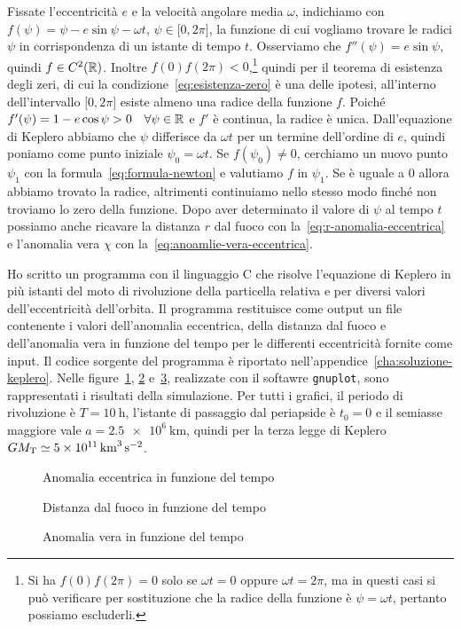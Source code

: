 Fissate l'eccentricità $e$ e la velocità angolare media $\omega$, indichiamo con
$f(\psi) = \psi -e\sin\psi-\omega t$, $\psi\in\mathopen{[}0, 2\pi\mathclose{]}$,
la funzione di cui vogliamo trovare le radici $\psi$ in corrispondenza di un
istante di tempo $t$. Osserviamo che $f''(\psi) = e\sin\psi$, quindi
$f\in C^2(\mathbb{R})$. Inoltre $f(0)f(2\pi) <
0$,\footnote{Si
  ha $f(0)f(2\pi) = 0$ solo se $\omega t = 0$ oppure $\omega t = 2\pi$, ma in
  questi casi si può verificare per sostituzione che la radice della funzione è
  $\psi = \omega t$, pertanto possiamo escluderli.}
quindi per il teorema di esistenza degli zeri, di cui la
condizione~\eqref{eq:esistenza-zero} è una delle ipotesi, all'interno
dell'intervallo $\mathopen{[}0, 2\pi\mathclose{]}$ esiste almeno una radice
della funzione $f$. Poiché
$f'(\psi) = 1 - e\cos\psi > 0 \quad \forall \psi\in\mathbb{R}$ e $f'$ è continua, la
radice è unica. Dall'equazione di Keplero abbiamo che $\psi$ differisce da
$\omega t$ per un termine dell'ordine di $e$, quindi poniamo come punto iniziale
$\psi_0 = \omega t$. Se $f(\psi_0)\neq 0$, cerchiamo un nuovo punto $\psi_1$ con
la formula~\eqref{eq:formula-newton} e valutiamo $f$ in $\psi_1$. Se è uguale a
$0$ allora abbiamo trovato la radice, altrimenti continuiamo nello stesso modo
finché non troviamo lo zero della funzione. Dopo aver determinato il valore di
$\psi$ al tempo $t$ possiamo anche ricavare la distanza $r$ dal fuoco con
la~\eqref{eq:r-anomalia-eccentrica} e l'anomalia vera $\chi$ con
la~\eqref{eq:anoamlie-vera-eccentrica}.

Ho scritto un programma con il linguaggio C che risolve l'equazione di Keplero
in più istanti del moto di rivoluzione della particella relativa e per diversi
valori dell'eccentricità dell'orbita. Il programma restituisce come output un
file contenente i valori dell'anomalia eccentrica, della distanza dal fuoco e
dell'anomalia vera in funzione del tempo per le differenti eccentricità fornite
come input. Il codice sorgente del programma è riportato
nell'appendice~\ref{cha:soluzione-keplero}. Nelle
figure~\ref{fig:newton-anomalia_eccentrica}, \ref{fig:newton-raggio}
e~\ref{fig:newton-anomalia_vera}, realizzate con il softawre \verb|gnuplot|,
sono rappresentati i risultati della simulazione. Per tutti i grafici, il
periodo di rivoluzione è $T = \SI{10}{\hour}$, l'istante di passaggio dal
periapside è $t_0 = 0$ e il semiasse maggiore vale $a =
\SI{2.5e6}{\kilo\metre}$,
quindi per la terza legge di Keplero
$GM_\textup{T} \simeq \SI{5e11}{\cubic\kilo\metre\per\square\second}$.
\begin{figure}
  \centering
  
  \caption{Anomalia eccentrica in funzione del tempo}
  \label{fig:newton-anomalia_eccentrica}
\end{figure}
\begin{figure}
  \centering
  
  \caption{Distanza dal fuoco in funzione del tempo}
  \label{fig:newton-raggio}
\end{figure}
\begin{figure}
  \centering
  
  \caption{Anomalia vera in funzione del tempo}
  \label{fig:newton-anomalia_vera}
\end{figure}

